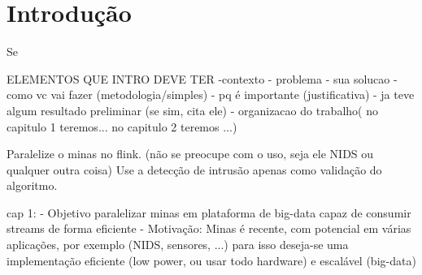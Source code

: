 
\chapter{Introdução}

Se

ELEMENTOS QUE INTRO DEVE TER
-contexto
- problema
- sua solucao
- como vc vai fazer (metodologia/simples)
- pq é importante (justificativa)
- ja teve algum resultado preliminar (se sim, cita ele)
- organizacao do trabalho( no capitulo 1 teremos... no capitulo 2 teremos ...)

Paralelize o minas no flink.
(não se preocupe com o uso, seja ele NIDS ou qualquer outra coisa)
Use a detecção de intrusão apenas como validação do algoritmo.


cap 1:
    - Objetivo paralelizar minas em plataforma de big-data capaz de consumir streams de forma eficiente
    - Motivação: Minas é recente, com potencial em várias aplicações, por exemplo (NIDS, sensores, ...)
        para isso deseja-se uma implementação eficiente (low power, ou usar todo hardware) e escalável (big-data)

